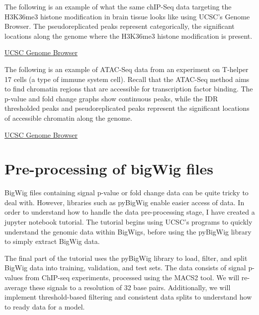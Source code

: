 \documentclass[
]{book}
\begin{document}
The following is an example of what the same chIP-Seq data targeting the H3K36me3 histone modification in brain tissue looks like using UCSC's Genome Browser. The pseudoreplicated peaks represent categorically, the significant locations along the genome where the H3K36me3 histone modification is present.

\href{https://genome.ucsc.edu/cgi-bin/hgTracks?db=hg38&lastVirtModeType=default&lastVirtModeExtraState=&virtModeType=default&virtMode=0&nonVirtPosition=&position=chr1\%3A11084744\%2D11095920&hgsid=2307713234_Kap236Tjt6ZGnnNrXMkIhq2Ajn27}{UCSC Genome Browser}

The following is an example of ATAC-Seq data from an experiment on T-helper 17 cells (a type of immune system cell). Recall that the ATAC-Seq method aims to find chromatin regions that are accessible for transcription factor binding. The p-value and fold change graphs show continuous peaks, while the IDR thresholded peaks and pseudoreplicated peaks represent the significant locations of accessible chromatin along the genome.

\href{https://genome.ucsc.edu/cgi-bin/hgTracks?db=hg38&lastVirtModeType=default&lastVirtModeExtraState=&virtModeType=default&virtMode=0&nonVirtPosition=&position=chr1\%3A88379533\%2D113275174&hgsid=2307721306_mcnECXS4Hy0fNQ4yz3ZQTL7nimkW}{UCSC Genome Browser}

\chapter{Pre-processing of bigWig files}\label{pre-processing-of-bigwig-files}

BigWig files containing signal p-value or fold change data can be quite tricky to deal with. However, libraries such as pyBigWig enable easier access of data. In order to understand how to handle the data pre-processing stage, I have created a jupyter notebook tutorial. The tutorial begins using UCSC's programs to quickly understand the genomic data within BigWigs, before using the pyBigWig library to simply extract BigWig data.

The final part of the tutorial uses the pyBigWig library to load, filter, and split BigWig data into training, validation, and test sets. The data consists of signal p-values from ChIP-seq experiments, processed using the MACS2 tool. We will re-average these signals to a resolution of 32 base pairs. Additionally, we will implement threshold-based filtering and consistent data splits to understand how to ready data for a model.
\end{document}
